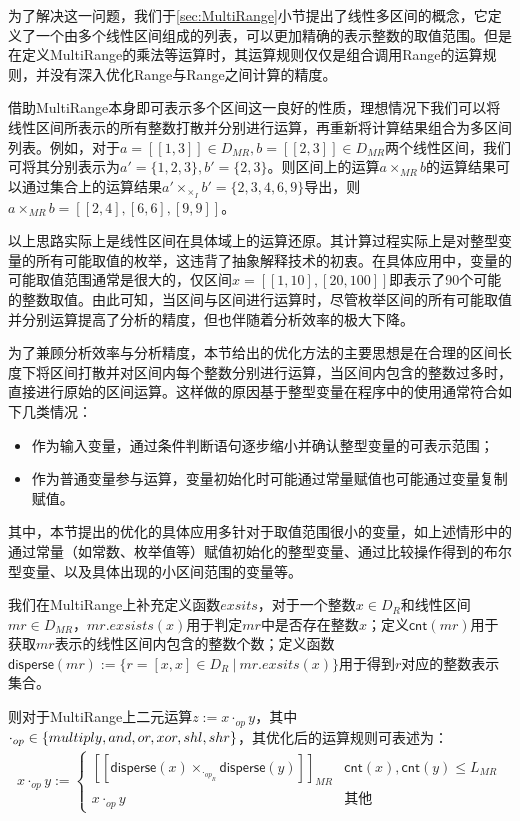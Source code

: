 为了解决这一问题，我们于\ref{sec:MultiRange}小节提出了线性多区间的概念，它定义了一个由多个线性区间组成的列表，可以更加精确的表示整数的取值范围。但是在定义MultiRange的乘法等运算时，其运算规则仅仅是组合调用Range的运算规则，并没有深入优化Range与Range之间计算的精度。

借助MultiRange本身即可表示多个区间这一良好的性质，理想情况下我们可以将线性区间所表示的所有整数打散并分别进行运算，再重新将计算结果组合为多区间列表。例如，对于$ a = [[1, 3]] \in D_{MR} , b = [[2, 3]] \in D_{MR}$两个线性区间，我们可将其分别表示为$ a' = \{1, 2, 3\}, b' = \{2, 3\} $。则区间上的运算$ a \times_{MR} b $的运算结果可以通过集合上的运算结果$ a' \times_{\times_I} b' = \{2, 3, 4, 6, 9\} $导出，则$ a \times_{MR} b = [[2, 4], [6, 6], [9, 9]] $。

以上思路实际上是线性区间在具体域上的运算还原。其计算过程实际上是对整型变量的所有可能取值的枚举，这违背了抽象解释技术的初衷。在具体应用中，变量的可能取值范围通常是很大的，仅区间$ x = [[1, 10], [20, 100]] $即表示了90个可能的整数取值。由此可知，当区间与区间进行运算时，尽管枚举区间的所有可能取值并分别运算提高了分析的精度，但也伴随着分析效率的极大下降。

为了兼顾分析效率与分析精度，本节给出的优化方法的主要思想是在合理的区间长度下将区间打散并对区间内每个整数分别进行运算，当区间内包含的整数过多时，直接进行原始的区间运算。这样做的原因基于整型变量在程序中的使用通常符合如下几类情况：
\begin{itemize}
	\item 作为输入变量，通过条件判断语句逐步缩小并确认整型变量的可表示范围；
	\item 作为普通变量参与运算，变量初始化时可能通过常量赋值也可能通过变量复制赋值。
\end{itemize}

其中，本节提出的优化的具体应用多针对于取值范围很小的变量，如上述情形中的通过常量（如常数、枚举值等）赋值初始化的整型变量、通过比较操作得到的布尔型变量、以及具体出现的小区间范围的变量等。

我们在MultiRange上补充定义函数$ exsits $，对于一个整数$ x \in D_R $和线性区间$ mr \in D_{MR} $，$ mr.exsists(x) $用于判定$ mr $中是否存在整数$ x $；定义$ \mathsf{cnt}(mr) $用于获取$ mr $表示的线性区间内包含的整数个数；定义函数$ \mathsf{disperse}(mr) := \{r = [x, x] \in D_R ~|~ mr.exsits(x) \}$用于得到$ r $对应的整数表示集合。

则对于MultiRange上二元运算$ z := x \cdot_{op} y$，其中$ \cdot_{op} \in \{ multiply, and, or, xor, \\shl, shr \} $，其优化后的运算规则可表述为：
\begin{align}
	x \cdot_{op} y := \begin{cases}
		[[\mathsf{disperse}(x) \times_{\cdot_{op_R}} \mathsf{disperse}(y)]]_{MR} & 
			\mathsf{cnt}(x), \mathsf{cnt}(y) \le L_{MR}\\
		x \cdot_{op} y & \text{其他}
	\end{cases}
\end{align}

